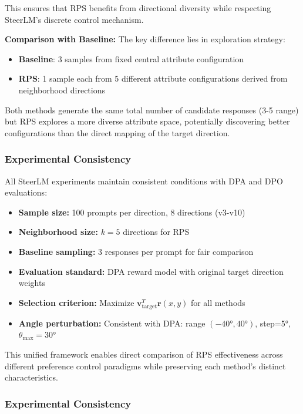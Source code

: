 \documentclass{article} %
\begin{document}
This ensures that RPS benefits from directional diversity while respecting SteerLM's discrete control mechanism.

\textbf{Comparison with Baseline:} The key difference lies in exploration strategy:
\begin{itemize}
    \item \textbf{Baseline}: 3 samples from fixed central attribute configuration
    \item \textbf{RPS}: 1 sample each from 5 different attribute configurations derived from neighborhood directions
\end{itemize}

Both methods generate the same total number of candidate responses (3-5 range) but RPS explores a more diverse attribute space, potentially discovering better configurations than the direct mapping of the target direction.

\subsubsection{Experimental Consistency}

All SteerLM experiments maintain consistent conditions with DPA and DPO evaluations:
\begin{itemize}
    \item \textbf{Sample size:} 100 prompts per direction, 8 directions (v3-v10)
    \item \textbf{Neighborhood size:} $k=5$ directions for RPS
    \item \textbf{Baseline sampling:} 3 responses per prompt for fair comparison
    \item \textbf{Evaluation standard:} DPA reward model with original target direction weights
    \item \textbf{Selection criterion:} Maximize $\mathbf{v}_{\text{target}}^T \mathbf{r}(x,y)$ for all methods
    \item \textbf{Angle perturbation:} Consistent with DPA: range $(-40°, 40°)$, step=5°, $\theta_{\max}=30°$
\end{itemize}

This unified framework enables direct comparison of RPS effectiveness across different preference control paradigms while preserving each method's distinct characteristics.

\subsubsection{Experimental Consistency}
\end{document}
